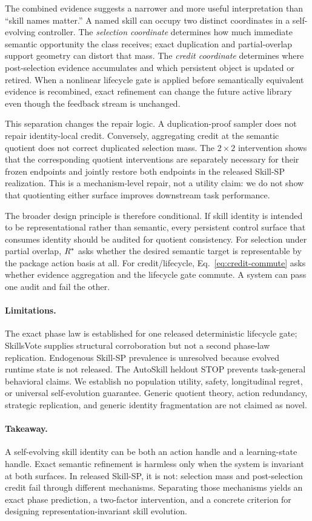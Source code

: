 The combined evidence suggests a narrower and more useful interpretation than ``skill names matter.'' A named skill can occupy two distinct coordinates in a self-evolving controller. The \emph{selection coordinate} determines how much immediate semantic opportunity the class receives; exact duplication and partial-overlap support geometry can distort that mass. The \emph{credit coordinate} determines where post-selection evidence accumulates and which persistent object is updated or retired. When a nonlinear lifecycle gate is applied before semantically equivalent evidence is recombined, exact refinement can change the future active library even though the feedback stream is unchanged.

This separation changes the repair logic. A duplication-proof sampler does not repair identity-local credit. Conversely, aggregating credit at the semantic quotient does not correct duplicated selection mass. The $2\times2$ intervention shows that the corresponding quotient interventions are separately necessary for their frozen endpoints and jointly restore both endpoints in the released Skill-SP realization. This is a mechanism-level repair, not a utility claim: we do not show that quotienting either surface improves downstream task performance.

The broader design principle is therefore conditional. If skill identity is intended to be representational rather than semantic, every persistent control surface that consumes identity should be audited for quotient consistency. For selection under partial overlap, $R^*$ asks whether the desired semantic target is representable by the package action basis at all. For credit/lifecycle, Eq.~\ref{eq:credit-commute} asks whether evidence aggregation and the lifecycle gate commute. A system can pass one audit and fail the other.

\paragraph{Limitations.}
The exact phase law is established for one released deterministic lifecycle gate; SkillsVote supplies structural corroboration but not a second phase-law replication. Endogenous Skill-SP prevalence is unresolved because evolved runtime state is not released. The AutoSkill heldout STOP prevents task-general behavioral claims. We establish no population utility, safety, longitudinal regret, or universal self-evolution guarantee. Generic quotient theory, action redundancy, strategic replication, and generic identity fragmentation are not claimed as novel.

\paragraph{Takeaway.}
A self-evolving skill identity can be both an action handle and a learning-state handle. Exact semantic refinement is harmless only when the system is invariant at both surfaces. In released Skill-SP, it is not: selection mass and post-selection credit fail through different mechanisms. Separating those mechanisms yields an exact phase prediction, a two-factor intervention, and a concrete criterion for designing representation-invariant skill evolution.
